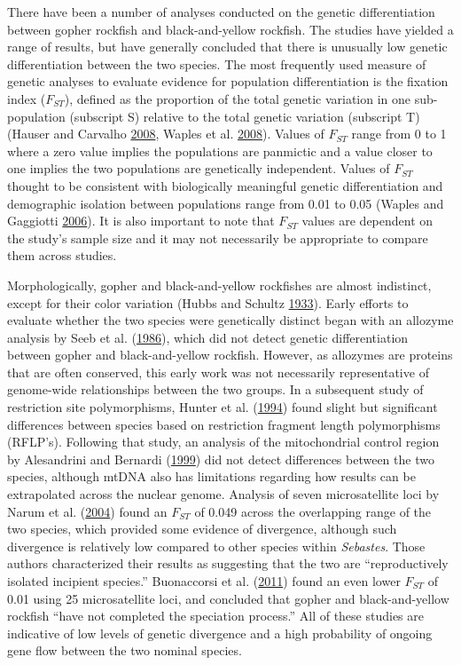 \documentclass[12pt,]{article}
\begin{document}
There have been a number of analyses conducted on the genetic
differentiation between gopher rockfish and black-and-yellow rockfish.
The studies have yielded a range of results, but have generally
concluded that there is unusually low genetic differentiation between
the two species. The most frequently used measure of genetic analyses to
evaluate evidence for population differentiation is the fixation index
(\(F_{ST}\)), defined as the proportion of the total genetic variation
in one sub-population (subscript S) relative to the total genetic
variation (subscript T) (Hauser and Carvalho
\protect\hyperlink{ref-Hauser2008}{2008}, Waples et al.
\protect\hyperlink{ref-Waples2008}{2008}). Values of \(F_{ST}\) range
from 0 to 1 where a zero value implies the populations are panmictic and
a value closer to one implies the two populations are genetically
independent. Values of \(F_{ST}\) thought to be consistent with
biologically meaningful genetic differentiation and demographic
isolation between populations range from 0.01 to 0.05 (Waples and
Gaggiotti \protect\hyperlink{ref-Waples2006}{2006}). It is also
important to note that \(F_{ST}\) values are dependent on the study's
sample size and it may not necessarily be appropriate to compare them
across studies.

Morphologically, gopher and black-and-yellow rockfishes are almost
indistinct, except for their color variation (Hubbs and Schultz
\protect\hyperlink{ref-Hubbs1933}{1933}). Early efforts to evaluate
whether the two species were genetically distinct began with an allozyme
analysis by Seeb et al. (\protect\hyperlink{ref-Seeb1986}{1986}), which
did not detect genetic differentiation between gopher and
black-and-yellow rockfish. However, as allozymes are proteins that are
often conserved, this early work was not necessarily representative of
genome-wide relationships between the two groups. In a subsequent study
of restriction site polymorphisms, Hunter et al.
(\protect\hyperlink{ref-Hunter1994}{1994}) found slight but significant
differences between species based on restriction fragment length
polymorphisms (RFLP's). Following that study, an analysis of the
mitochondrial control region by Alesandrini and Bernardi
(\protect\hyperlink{ref-Alesandrini1999}{1999}) did not detect
differences between the two species, although mtDNA also has limitations
regarding how results can be extrapolated across the nuclear genome.
Analysis of seven microsatellite loci by Narum et al.
(\protect\hyperlink{ref-Narum2004}{2004}) found an \(F_{ST}\) of 0.049
across the overlapping range of the two species, which provided some
evidence of divergence, although such divergence is relatively low
compared to other species within \emph{Sebastes}. Those authors
characterized their results as suggesting that the two are
``reproductively isolated incipient species.'' Buonaccorsi et al.
(\protect\hyperlink{ref-Buonaccorsi2011}{2011}) found an even lower
\(F_{ST}\) of 0.01 using 25 microsatellite loci, and concluded that
gopher and black-and-yellow rockfish ``have not completed the speciation
process.'' All of these studies are indicative of low levels of genetic
divergence and a high probability of ongoing gene flow between the two
nominal species.
\end{document}
